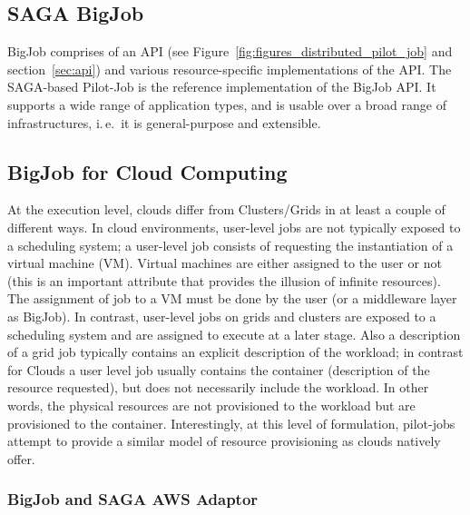 \documentclass[]{article}
\begin{document}
\subsection{SAGA BigJob}


BigJob comprises of an API (see Figure~\ref{fig:figures_distributed_pilot_job}
and section~\ref{sec:api}) and various resource-specific implementations of the
API. The SAGA-based Pilot-Job is the reference implementation of the BigJob API.
It supports a wide range of application types, and is usable over a broad range
of infrastructures, i.\,e.\ it is general-purpose and extensible.


\subsection{BigJob for Cloud Computing}

At the execution level, clouds differ from Clusters/Grids in at least a couple
of different ways. In cloud environments, user-level jobs are not typically
exposed to a scheduling system; a user-level job consists of requesting the
instantiation of a virtual machine (VM). Virtual machines are either assigned to
the user or not (this is an important attribute that provides the illusion of
infinite resources). The assignment of job to a VM must be done by the user (or
a middleware layer as BigJob). In contrast, user-level jobs on grids and 
clusters are exposed to a scheduling system and are
assigned to execute at a later stage. Also a description of a grid job typically
contains an explicit description of the workload; in contrast for Clouds a user
level job usually contains the container (description of the resource
requested), but does not necessarily include the workload. In other words, the
physical resources are not provisioned to the workload but are provisioned to
the container.  Interestingly, at this level of formulation, pilot-jobs attempt 
to provide a similar model of resource provisioning as clouds natively offer. 

\subsubsection{BigJob and SAGA AWS Adaptor}
\end{document}
